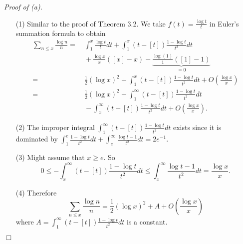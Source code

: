 \documentclass{article}
\begin{document}
\emph{Proof of (a).}
\begin{enumerate}
\item[(1)]
  Similar to the proof of Theorem 3.2.
  We take $f(t) = \frac{\log t}{t}$ in Euler's summation formula to obtain
  \begin{align*}
    \sum_{n \leq x} \frac{\log n}{n}
    = & \: \int_{1}^{x} \frac{\log t}{t} dt
        + \int_{1}^{x}(t-[t])\frac{1-\log t}{t^2} dt \\
      & \: + \frac{\log x}{x}([x]-x) - \underbrace{\frac{\log(1)}{1}([1]-1)}_{= 0} \\
    = & \: \frac{1}{2} (\log x)^2
        + \int_{1}^{x}(t-[t])\frac{1-\log t}{t^2} dt + O\left( \frac{\log x}{x} \right) \\
    = & \: \frac{1}{2} (\log x)^2 + \int_{1}^{\infty}(t-[t])\frac{1-\log t}{t^2} dt \\
      & \: - \int_{x}^{\infty}(t-[t])\frac{1-\log t}{t^2} dt + O\left( \frac{\log x}{x} \right).
  \end{align*}

\item[(2)]
  The improper integral $\int_{1}^{\infty}(t-[t])\frac{1-\log t}{t^2} dt$
  exists since it is dominated by
  $\int_{1}^{e} \frac{1-\log t}{t^2} dt + \int_{e}^{\infty} \frac{\log t - 1}{t^2} dt = 2e^{-1}$.

\item[(3)]
  Might assume that $x \geq e$.
  So
  \[
    0
    \leq -\int_{x}^{\infty}(t-[t])\frac{1-\log t}{t^2} dt
    \leq \int_{x}^{\infty}\frac{\log t - 1}{t^2} dt
    = \frac{\log x}{x}.
  \]

\item[(4)]
  Therefore
  \[
    \sum_{n \leq x} \frac{\log n}{n}
    = \frac{1}{2} (\log x)^2 + A + O\left( \frac{\log x}{x} \right)
  \]
  where $A = \int_{1}^{\infty}(t-[t])\frac{1-\log t}{t^2} dt$ is a constant.
\end{enumerate}
$\Box$ \\
\end{document}
